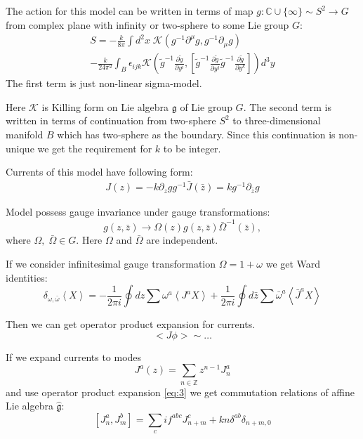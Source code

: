 \documentclass[12pt]{article}
\theoremstyle{definition}
\newcommand{\gf}{\mathfrak{g}}
\newcommand{\gfh}{\hat{\mathfrak{g}}}
\theoremstyle{definition} \newtheorem{Def}{Definition}
\begin{document}
 The action for this model can be written in terms of map $g:\mathbb{C}\cup \{\infty\}\sim S^{2}\to G$ from complex plane with infinity or two-sphere to some Lie group $G$:
\begin{multline}
  S=-\frac{k}{8\pi}\int d^2x\; \mathcal{K} (g^{-1}\partial^{\mu}g, g^{-1} \partial_{\mu}g)  
  \\
  - \frac{k }{24\pi^{2}} \int_{B}\epsilon_{ijk} \mathcal{K}\left(
    \tilde g^{-1}\frac{\partial \tilde g}{\partial y^i},\left[
      \tilde g^{-1}\frac{\partial \tilde g}{\partial y^j}
      \tilde g^{-1}\frac{\partial \tilde g}{\partial y^k}\right]\right) d^3y
\end{multline}
The first term is just non-linear sigma-model.

 Here $\mathcal{K}$ is Killing form on Lie algebra $\gf$ of Lie group $G$. The second term is written in terms of continuation from two-sphere $S^{2}$ to three-dimensional manifold $B$ which has two-sphere as the boundary. Since this continuation is non-unique we get the requirement for $k$ to be integer. 

Currents of this model have following form:
  \begin{eqnarray}
    J(z)= -k \partial_zg g^{-1}
    \bar J(\bar z)=k g^{-1}\partial_{\bar z}g
  \end{eqnarray}

Model possess gauge invariance under gauge transformations:
  \begin{equation*}
    g(z,\bar z)\to \Omega(z)g(z,\bar z)\bar \Omega^{-1}(\bar z),
  \end{equation*}
  where $\Omega,\;\bar \Omega \in G$.
Here $\Omega$ and $\bar \Omega$ are independent. 

If we consider infinitesimal gauge transformation $\Omega=1+\omega$ we get Ward identities:
  \begin{equation}
    \label{eq:87}
    \delta_{\omega,\bar \omega}\left< X \right>=-\frac{1}{2\pi i}\oint dz \sum\omega^a \left< J^a X\right>+
    \frac{1}{2\pi i} \oint d\bar z \sum \bar \omega^a \left< \bar J^a X\right>
  \end{equation}

 Then we can get operator product expansion for currents. 
 \begin{equation}
   \label{eq:3}
   <J\phi>\sim \dots
 \end{equation}

If we expand currents to modes
\begin{equation*}
  J^a(z)=\sum\limits_{n\in \mathbb Z}z^{n-1}J^a_n 
\end{equation*}
and use operator product expansion \eqref{eq:3} we get commutation relations of affine Lie algebra $\gfh$:
\begin{equation}
  \left[J^a_n,J^b_m\right]=\sum_c i f^{abc}J^c_{n+m}+kn\delta^{ab}\delta_{n+m,0} 
\end{equation}
\end{document}

